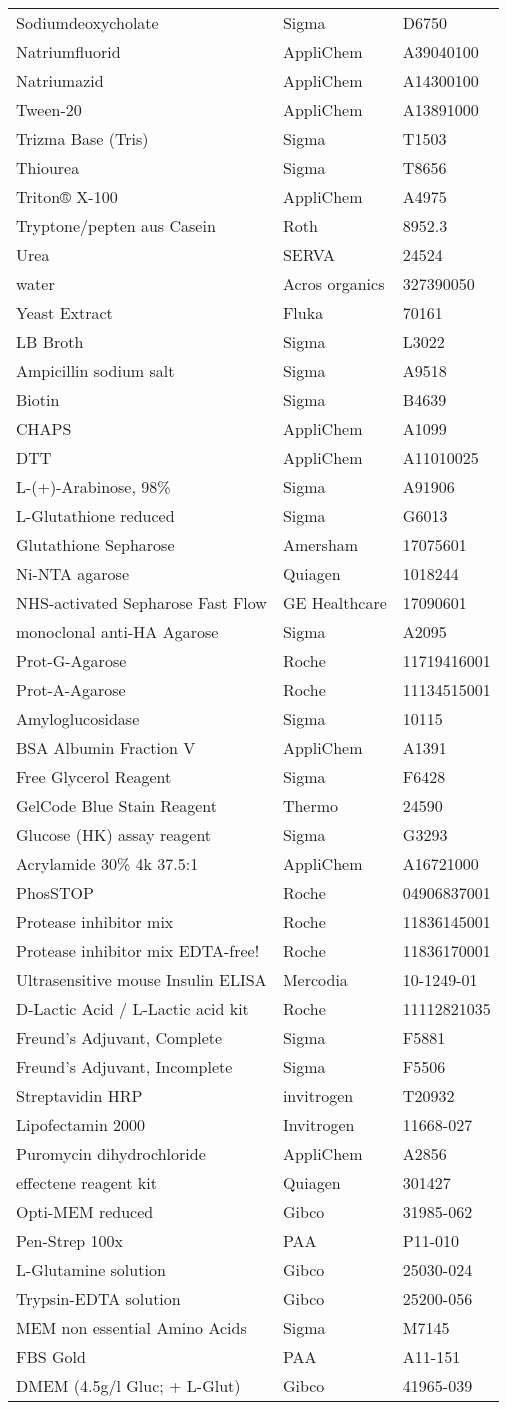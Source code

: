 \begin{longtable}{lll}
Sodiumdeoxycholate&Sigma&D6750\tabularnewline
Natriumfluorid&AppliChem&A39040100\tabularnewline
Natriumazid&AppliChem&A14300100\tabularnewline
Tween-20&AppliChem&A13891000\tabularnewline
Trizma Base (Tris)&Sigma&T1503\tabularnewline
Thiourea&Sigma&T8656\tabularnewline
Triton® X-100&AppliChem&A4975\tabularnewline
Tryptone/pepten aus Casein&Roth&8952.3\tabularnewline
Urea&SERVA&24524\tabularnewline
water&Acros organics&327390050\tabularnewline
Yeast Extract&Fluka&70161\tabularnewline
LB Broth&Sigma&L3022\tabularnewline
Ampicillin sodium salt&Sigma&A9518\tabularnewline
Biotin&Sigma&B4639\tabularnewline
CHAPS&AppliChem&A1099\tabularnewline
DTT&AppliChem&A11010025\tabularnewline
L-(+)-Arabinose, 98\%&Sigma&A91906\tabularnewline
L-Glutathione reduced&Sigma&G6013\tabularnewline
Glutathione Sepharose&Amersham&17075601\tabularnewline
Ni-NTA agarose&Quiagen&1018244\tabularnewline
NHS-activated Sepharose Fast Flow&GE Healthcare&17090601\tabularnewline
monoclonal anti-HA Agarose&Sigma&A2095\tabularnewline
Prot-G-Agarose&Roche&11719416001\tabularnewline
Prot-A-Agarose&Roche&11134515001\tabularnewline
Amyloglucosidase&Sigma&10115\tabularnewline
BSA Albumin Fraction V&AppliChem&A1391\tabularnewline
Free Glycerol Reagent&Sigma&F6428\tabularnewline
GelCode Blue Stain Reagent&Thermo&24590\tabularnewline
Glucose (HK) assay reagent&Sigma&G3293\tabularnewline
Acrylamide 30\% 4k 37.5:1&AppliChem&A16721000\tabularnewline
PhosSTOP&Roche&04906837001\tabularnewline
Protease inhibitor mix&Roche&11836145001\tabularnewline
\newpage
Protease inhibitor mix EDTA-free!&Roche&11836170001\tabularnewline
Ultrasensitive mouse Insulin ELISA&Mercodia&10-1249-01\tabularnewline
D-Lactic Acid / L-Lactic acid kit&Roche&11112821035\tabularnewline
Freund's Adjuvant, Complete&Sigma&F5881\tabularnewline
Freund's Adjuvant, Incomplete&Sigma&F5506\tabularnewline
Streptavidin HRP&invitrogen&T20932\tabularnewline
Lipofectamin 2000&Invitrogen&11668-027\tabularnewline
Puromycin dihydrochloride&AppliChem&A2856\tabularnewline
effectene reagent kit&Quiagen&301427\tabularnewline
Opti-MEM reduced&Gibco&31985-062\tabularnewline
Pen-Strep 100x&PAA&P11-010\tabularnewline
L-Glutamine solution&Gibco&25030-024\tabularnewline
Trypsin-EDTA solution&Gibco&25200-056\tabularnewline
MEM non essential Amino Acids&Sigma&M7145\tabularnewline
FBS Gold&PAA&A11-151\tabularnewline
DMEM (4.5g/l Gluc; + L-Glut)&Gibco&41965-039\tabularnewline
\hline
\end{longtable}
